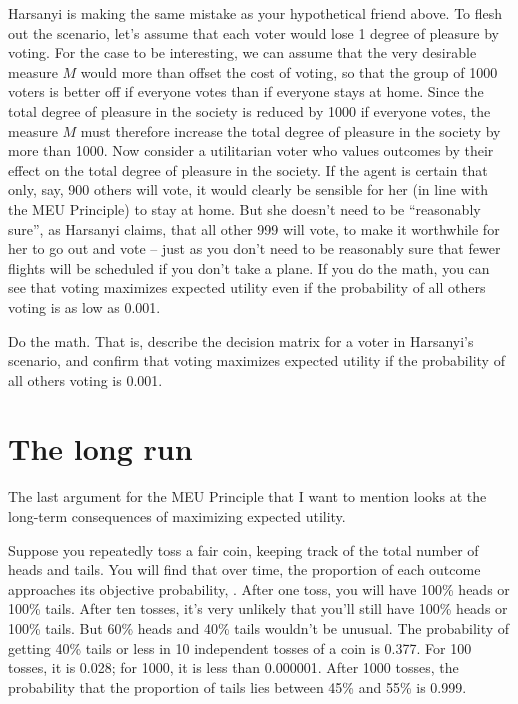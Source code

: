 Harsanyi is making the same mistake as your hypothetical friend above.
To flesh out the scenario, let's assume that each voter would lose 1
degree of pleasure by voting. For the case to be interesting, we can
assume that the very desirable measure $M$ would more than offset the
cost of voting, so that the group of 1000 voters is better off if
everyone votes than if everyone stays at home. Since the total degree
of pleasure in the society is reduced by 1000 if everyone votes, the
measure $M$ must therefore increase the total degree of pleasure in
the society by more than 1000. Now consider a utilitarian voter who
values outcomes by their effect on the total degree of pleasure in the
society. If the agent is certain that only, say, 900 others will vote,
it would clearly be sensible for her (in line with the MEU Principle)
to stay at home. But she doesn't need to be ``reasonably sure'', as
Harsanyi claims, that all other 999 will vote, to make it worthwhile
for her to go out and vote -- just as you don't need to be reasonably
sure that fewer flights will be scheduled if you don't take a plane.
If you do the math, you can see that voting maximizes expected utility
even if the probability of all others voting is as low as 0.001.

\begin{exercise}{3}
  Do the math. That is, describe the decision matrix for a voter in
  Harsanyi's scenario, and confirm that voting maximizes expected
  utility if the probability of all others voting is
  0.001.
\end{exercise}

\section{The long run}

The last argument for the MEU Principle that I want to mention looks
at the long-term consequences of maximizing expected utility.

Suppose you repeatedly toss a fair coin, keeping track of the total
number of heads and tails. You will find that over time, the
proportion of each outcome approaches its objective probability,
. After one toss, you will have 100\% heads or 100\%
tails. After ten tosses, it's very unlikely that you'll still have
100\% heads or 100\% tails. But 60\% heads and 40\% tails wouldn't be
unusual. The probability of getting 40\% tails or less in 10
independent tosses of a coin is 0.377. For 100 tosses, it is 0.028;
for 1000, it is less than 0.000001. After 1000 tosses, the probability
that the proportion of tails lies between 45\% and 55\% is 0.999.

